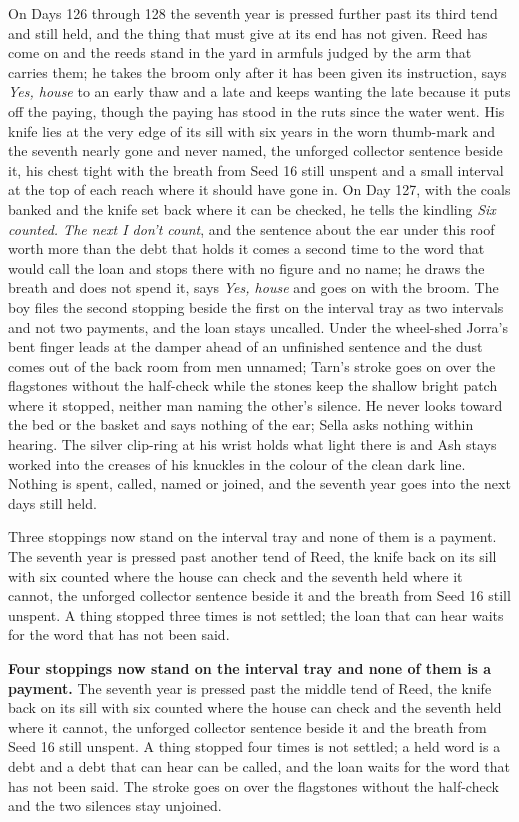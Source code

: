 \documentclass{design/chronicle}
\begin{document}
{On Days 126 through 128 the seventh year is pressed further past its third tend and still held, and the thing that must give at its end has not given. Reed has come on and the reeds stand in the yard in armfuls judged by the arm that carries them; he takes the broom only after it has been given its instruction, says \emph{Yes, house} to an early thaw and a late and keeps wanting the late because it puts off the paying, though the paying has stood in the ruts since the water went. His knife lies at the very edge of its sill with six years in the worn thumb-mark and the seventh nearly gone and never named, the unforged collector sentence beside it, his chest tight with the breath from Seed 16 still unspent and a small interval at the top of each reach where it should have gone in. On Day 127, with the coals banked and the knife set back where it can be checked, he tells the kindling \emph{Six counted. The next I don’t count}, and the sentence about the ear under this roof worth more than the debt that holds it comes a second time to the word that would call the loan and stops there with no figure and no name; he draws the breath and does not spend it, says \emph{Yes, house} and goes on with the broom. The boy files the second stopping beside the first on the interval tray as two intervals and not two payments, and the loan stays uncalled. Under the wheel-shed Jorra’s bent finger leads at the damper ahead of an unfinished sentence and the dust comes out of the back room from men unnamed; Tarn’s stroke goes on over the flagstones without the half-check while the stones keep the shallow bright patch where it stopped, neither man naming the other’s silence. He never looks toward the bed or the basket and says nothing of the ear; Sella asks nothing within hearing. The silver clip-ring at his wrist holds what light there is and Ash stays worked into the creases of his knuckles in the colour of the clean dark line. Nothing is spent, called, named or joined, and the seventh year goes into the next days still held.

Three stoppings now stand on the interval tray and none of them is a payment. The seventh year is pressed past another tend of Reed, the knife back on its sill with six counted where the house can check and the seventh held where it cannot, the unforged collector sentence beside it and the breath from Seed 16 still unspent. A thing stopped three times is not settled; the loan that can hear waits for the word that has not been said.

\textbf{Four stoppings now stand on the interval tray and none of them is a payment.} The seventh year is pressed past the middle tend of Reed, the knife back on its sill with six counted where the house can check and the seventh held where it cannot, the unforged collector sentence beside it and the breath from Seed 16 still unspent. A thing stopped four times is not settled; a held word is a debt and a debt that can hear can be called, and the loan waits for the word that has not been said. The stroke goes on over the flagstones without the half-check and the two silences stay unjoined.

}
\end{document}

